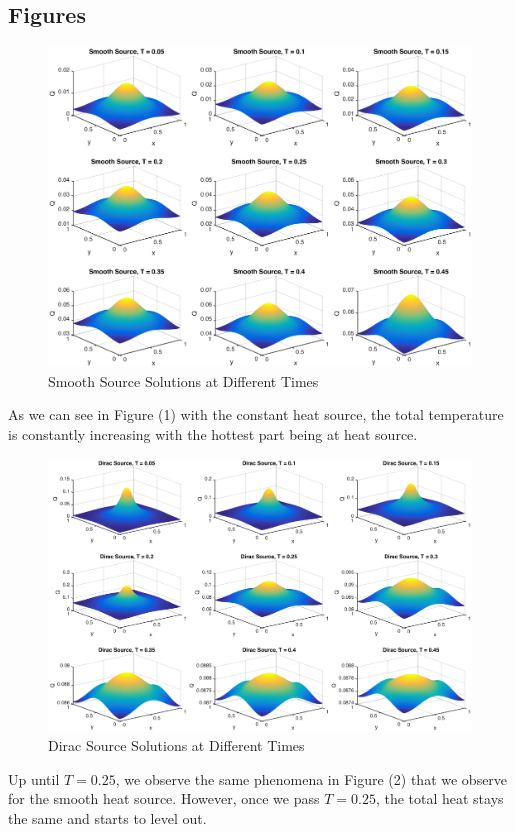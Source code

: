 \subsection{Figures}
\begin{figure}[!htb]
\centering
\includegraphics[scale=.5]{smoothSource4_1.eps}
\caption{Smooth Source Solutions at Different Times}
\label{fig:digraph}
\end{figure}
As we can see in Figure (1) with the constant heat source, the total temperature is constantly increasing with the hottest part being at heat source.
\begin{figure}[!htb]
\centering
\includegraphics[scale=.5]{diracSource4_1.eps}
\caption{Dirac Source Solutions at Different Times}
\label{fig:digraph}
\end{figure}
Up until $T=0.25$, we observe the same phenomena in Figure (2) that we observe for the smooth heat source. However, once we pass $T=0.25$, the total heat stays the same and starts to level out. 
